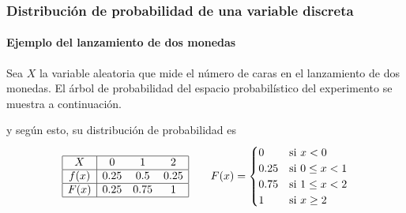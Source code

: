\begin{frame}
\frametitle{Distribución de probabilidad de una variable discreta}
\framesubtitle{Ejemplo del lanzamiento de dos monedas}
Sea $X$ la variable aleatoria que mide el número de caras en el lanzamiento de dos monedas. 
El árbol de probabilidad del espacio probabilístico del experimento se muestra a continuación.

\begin{center}
\end{center}

y según esto, su distribución de probabilidad es
\[
\begin{array}{|c|ccc|}
\hline
X & 0 & 1 & 2\\ \hline
f(x) & 0.25 & 0.5 & 0.25\\
\hline
F(x) & 0.25 & 0.75 & 1 \\
\hline 
\end{array}
\qquad
F(x) =
\begin{cases}
0 & \mbox{si $x<0$}\\
0.25 & \mbox{si $0\leq x< 1$}\\
0.75 & \mbox{si $1\leq x< 2$}\\
1 & \mbox{si $x\geq 2$}
\end{cases}
\]
\end{frame}


